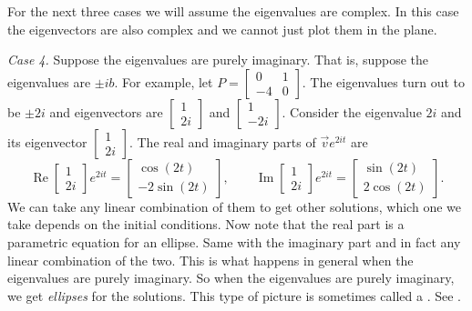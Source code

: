 \medskip

\pagebreak[0]
For the next three cases we will assume the eigenvalues are complex.  In this
case the eigenvectors are also complex and we cannot just plot them in the
plane.

\medskip

\pagebreak[0]
\emph{Case 4.} Suppose the eigenvalues are purely imaginary.
That is, suppose the eigenvalues are $\pm ib$.  For example,
let $P = 
\left[ \begin{smallmatrix} 0 & 1 \\ -4 & 0 \end{smallmatrix} \right]$.
The eigenvalues turn out to be $\pm 2i$ and eigenvectors are
$\left[ \begin{smallmatrix} 1 \\ 2i \end{smallmatrix} \right]$ and
$\left[ \begin{smallmatrix} 1 \\ -2i \end{smallmatrix} \right]$.  Consider
the eigenvalue $2i$ and its eigenvector
$\left[ \begin{smallmatrix} 1 \\ 2i \end{smallmatrix} \right]$.
The real and imaginary
parts of $\vec{v} e^{2it}$ are
\begin{equation*}
\operatorname{Re}
\begin{bmatrix} 1 \\ 2i \end{bmatrix} e^{2it} =
\begin{bmatrix} \cos (2t) \\ -2 \sin (2t)  \end{bmatrix} ,
\qquad
\operatorname{Im}
\begin{bmatrix} 1 \\ 2i \end{bmatrix} e^{2it} =
\begin{bmatrix} \sin (2t) \\ 2 \cos (2t) \end{bmatrix} .
\end{equation*}
We can take any linear combination of them to get other solutions,
which one we take
depends on the initial
conditions.  Now note that the real part is
a parametric equation for an ellipse.  Same with the imaginary part
and in fact any linear combination of the two.
This is what happens in general when the eigenvalues are purely imaginary.
So when the eigenvalues are purely imaginary, we get
\emph{ellipses} for the
solutions.  This type of picture is sometimes called a
\emph{}.  See .

